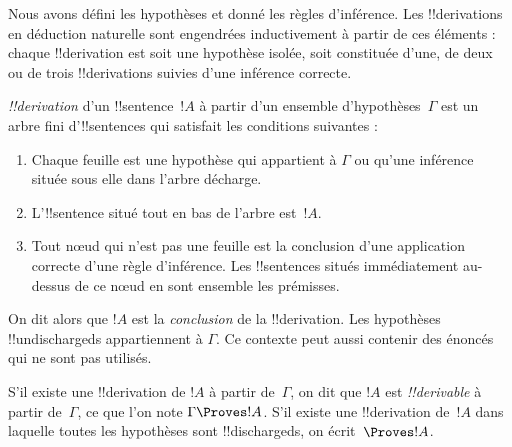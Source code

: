 \documentclass[../../../include/open-logic-section]{subfiles}
\begin{document}
      {}
      {}


\begin{explain}
Nous avons défini les hypothèses et donné les règles d'inférence.
Les !!{derivation}s en déduction naturelle sont engendrées
inductivement à partir de ces éléments : chaque !!{derivation}
est soit une hypothèse isolée, soit constituée d'une, de deux ou de
trois !!{derivation}s suivies d'une inférence correcte.
\end{explain}

\begin{defn}[!!^{derivation}]
 \emph{!!{derivation}} d'un !!{sentence}~$!A$
à partir d'un ensemble d'hypothèses~$\Gamma$ est un arbre fini
d'!!{sentence}s qui satisfait les conditions suivantes :
\begin{enumerate}
\item Chaque feuille est une hypothèse qui appartient à $\Gamma$
  ou qu'une inférence située sous elle dans l'arbre décharge.
\item L'!!{sentence} situé tout en bas de l'arbre est~$!A$.
\item Tout nœud qui n'est pas une feuille est la conclusion d'une
  application correcte d'une règle d'inférence. Les !!{sentence}s
  situés immédiatement au-dessus de ce nœud en sont ensemble
  les prémisses.
\end{enumerate}
On dit alors que $!A$ est la \emph{conclusion} de la !!{derivation}.
Les hypothèses !!{undischarged}s appartiennent à $\Gamma$. Ce
contexte peut aussi contenir des énoncés qui ne sont pas utilisés.
%

S'il existe une !!{derivation} de $!A$ à partir de~$\Gamma$,
on dit que $!A$ est \emph{!!{derivable}} à partir de~$\Gamma$,
ce que l'on note $\Gamma \Proves !A$. S'il existe une
!!{derivation} de~$!A$ dans laquelle toutes les hypothèses sont
!!{discharged}s, on écrit~$\Proves !A$.
\end{defn}
\end{document}
